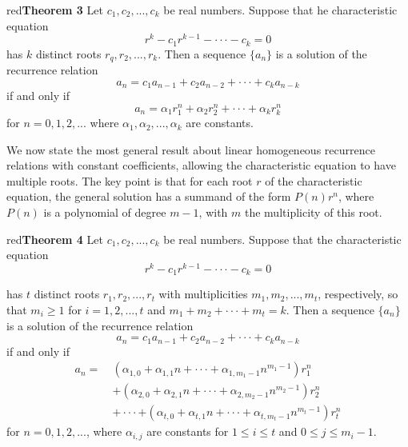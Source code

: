 \documentclass[11pt]{article}
\newenvironment{theorem}[1]{\begin{mybox}{red}{\textbf{Theorem #1}}}{\end{mybox}}
\begin{document}
\begin{theorem}{3}
Let $c_1, c_2, ..., c_k$ be real numbers. Suppose that he characteristic equation
\begin{equation*}
    r^k - c_1r^{k-1} - \cdot \cdot \cdot - c_k = 0
\end{equation*}
has $k$ distinct roots $r_q, r_2, ..., r_k$. Then a sequence $\{a_n\}$ is a solution of the recurrence relation
\begin{equation*}
    a_n = c_1a_{n-1} + c_2a_{n-2} + \cdot \cdot \cdot + c_ka_{n-k}
\end{equation*}
if and only if
\begin{equation*}
    a_n = \alpha_1r_1^n + \alpha_2r_2^n + \cdot \cdot \cdot + \alpha_kr_k^n
\end{equation*}
for $n = 0, 1, 2, ...$ where $\alpha_1, \alpha_2, ..., \alpha_k$ are constants.
\end{theorem}

We now state the most general result about linear homogeneous recurrence relations with constant coefficients, allowing the characteristic equation to have multiple roots. The key point is that for each root $r$ of the characteristic equation, the general solution has a summand of the form $P(n)r^n$, where $P(n)$ is a polynomial of degree $m - 1$, with $m$ the multiplicity of this root.

\begin{theorem}{4}
Let $c_1, c_2, ..., c_k$ be real numbers. Suppose that the characteristic equation
\begin{equation*}
    r^k - c_1r^{k-1} - \cdot \cdot \cdot - c_k = 0
\end{equation*}

has $t$ distinct roots $r_1, r_2, ..., r_t$ with multiplicities $m_1, m_2, ..., m_t$, respectively, so that $m_i \geq 1$ for $i = 1, 2, ..., t$ and $m_1 + m_2 + \cdot \cdot \cdot + m_t = k$. Then a sequence $\{a_n\}$ is a solution of the recurrence relation
\begin{equation*}
    a_n = c_1a_{n-1} + c_2a_{n-2} + \cdot \cdot \cdot + c_ka_{n-k}
\end{equation*}
if and only if
\begin{align*}
    a_n =\ &(\alpha_{1,0} + \alpha_{1,1}n + \cdot \cdot \cdot + \alpha_{1,m_1-1}n^{m_1-1})r_1^n \\
    &+ (\alpha_{2,0} + \alpha_{2,1}n + \cdot \cdot \cdot + \alpha_{2,m_2-1}n^{m_2-1})r_2^n\\
    &+ \cdot \cdot \cdot + (\alpha_{t,0} + \alpha_{t,1}n + \cdot \cdot \cdot + \alpha_{t,m_t-1}n^{m_t-1})r_t^n
\end{align*}
for $n = 0, 1, 2, ...$, where $\alpha_{i,j}$ are constants for $1 \leq i \leq t$ and $0 \leq j \leq m_i - 1$.
\end{theorem}
\end{document}
